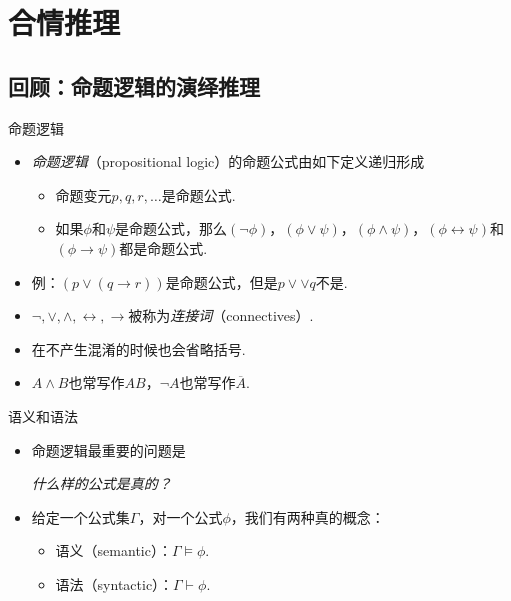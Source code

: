 \chapter{合情推理}\label{chap:plausible-reasoning}


\section{回顾：命题逻辑的演绎推理}
{命题逻辑}
\begin{itemize}
    \item \emph{命题逻辑}（propositional logic）的命题公式由如下定义递归形成
    \begin{itemize}
        \item 命题变元$p,q,r,\dots$是命题公式.
        \item 如果$\phi$和$\psi$是命题公式，那么$(\neg\phi)$，$(\phi\vee\psi)$，$(\phi\wedge\psi)$，$(\phi\leftrightarrow\psi)$和$(\phi\to\psi)$都是命题公式.
    \end{itemize}
    \item 例：$(p\vee(q\to r))$是命题公式，但是$p\vee\vee q$不是.
    \item $\neg,\vee,\wedge,\leftrightarrow,\to$被称为\emph{连接词}（connectives）.
    \item 在不产生混淆的时候也会省略括号.
    \item $A\wedge B$也常写作$AB$，$\neg A$也常写作$\overline{A}$.
\end{itemize}


{语义和语法}
\begin{itemize}
    \item 命题逻辑最重要的问题是
    
    \begin{center}
    \itshape
        什么样的公式是真的？    
    \end{center}
    
    \item 给定一个公式集$\Gamma$，对一个公式$\phi$，我们有两种真的概念：
    \begin{itemize}
        \item 语义（semantic）：$\Gamma\models \phi$.
        \item 语法（syntactic）：$\Gamma\vdash \phi$.
    \end{itemize}
\end{itemize}



